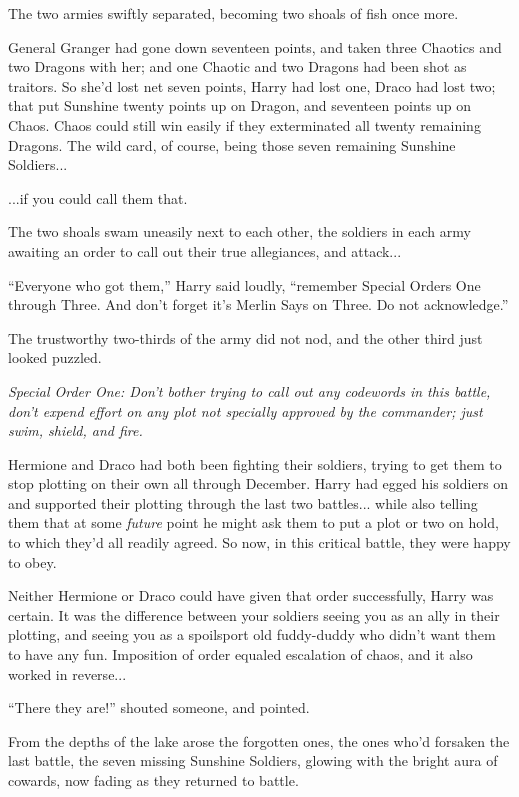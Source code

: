 The two armies swiftly separated, becoming two shoals of fish once more.

General Granger had gone down seventeen points, and taken three Chaotics
and two Dragons with her; and one Chaotic and two Dragons had been shot
as traitors. So she'd lost net seven points, Harry had lost one, Draco
had lost two; that put Sunshine twenty points up on Dragon, and
seventeen points up on Chaos. Chaos could still win easily if they
exterminated all twenty remaining Dragons. The wild card, of course,
being those seven remaining Sunshine Soldiers...

...if you could call them that.

The two shoals swam uneasily next to each other, the soldiers in each
army awaiting an order to call out their true allegiances, and
attack...

``Everyone who got them,'' Harry said loudly, ``remember Special Orders
One through Three. And don't forget it's Merlin Says on Three. Do not
acknowledge.''

The trustworthy two-thirds of the army did not nod, and the other third
just looked puzzled.

\emph{Special Order One: Don't bother trying to call out any codewords
in this battle, don't expend effort on any plot not specially approved
by the commander; just swim, shield, and fire.}

Hermione and Draco had both been fighting their soldiers, trying to get
them to stop plotting on their own all through December. Harry had egged
his soldiers on and supported their plotting through the last two
battles... while also telling them that at some \emph{future} point
he might ask them to put a plot or two on hold, to which they'd all
readily agreed. So now, in this critical battle, they were happy to
obey.

Neither Hermione or Draco could have given that order successfully,
Harry was certain. It was the difference between your soldiers seeing
you as an ally in their plotting, and seeing you as a spoilsport old
fuddy-duddy who didn't want them to have any fun. Imposition of order
equaled escalation of chaos, and it also worked in reverse...

``There they are!'' shouted someone, and pointed.

From the depths of the lake arose the forgotten ones, the ones who'd
forsaken the last battle, the seven missing Sunshine Soldiers, glowing
with the bright aura of cowards, now fading as they returned to battle.

